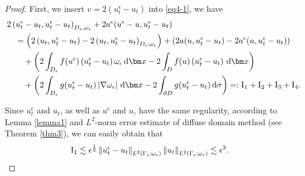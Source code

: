 \documentclass[3p,times]{elsarticle}
\numberwithin{equation}{section}
\newcommand{\dd}{\,{\rm d}}
\begin{document}
\begin{proof}
	First, we insert $v=2(u^{\epsilon}_t-u_t)$ into \eqref{eq4-1}, we have
	\begin{equation}
		\begin{aligned}
			\label{thm5-2}
			&2\left(u_t^{\epsilon}-u_t,u_t^{\epsilon}-u_t\right)_{D_{\epsilon},\omega_{\epsilon}}+2a^{\epsilon}(u^{\epsilon}-u,u_t^{\epsilon}-u_t)\\
			&\quad = \left(2\left(u_t,u_t^{\epsilon}-u_t\right)-2\left(u_t,u_t^{\epsilon}-u_t\right)_{D_{\epsilon};\omega_{\epsilon}}\right)+\left(2a(u,u_t^{\epsilon}-u_t)-2a^{\epsilon}(u,u_t^{\epsilon}-u_t)\right)\\
			&\quad \quad +\left(2\int_{D_{\epsilon}} f(u^{\epsilon})\left(u^{\epsilon}_t-u_t\right)\omega_{\epsilon}\dd\bm x-2\int_D f(u)\left(u_t^{\epsilon}-u_t\right)\dd\bm x\right)\\
			&\quad\quad+\left(2\int_{D_{\epsilon}}g(u_t^{\epsilon}-u_t)\left|\nabla\omega_{\epsilon}\right|\dd \bm x-2\int_{\partial D}g(u_t^{\epsilon}-u_t)\dd\sigma \right)=:\rm{I}_1+\rm{I}_2+\rm{I}_3+\rm{I}_4 .
		\end{aligned} 
	\end{equation}
	
	Since $u^{\epsilon}_t$ and $u_t$, as well as $u^{\epsilon}$ and $u$, have the same regularity, according to Lemma \ref{lemma1} and $L^2$-norm error estimate of diffuse domain method (see Theorem \ref{thm3}), we can easily obtain that
	\begin{equation}
		\begin{aligned}
			\label{thm5-3}
			\rm{I}_1 &\lesssim \epsilon^{\frac 1 2}\left\|u_t^{\epsilon}-u_t\right\|_{L^2(\Gamma_{\epsilon};\omega_{\epsilon})}\left\|u_t\right\|_{L^2(\Gamma_{\epsilon};\omega_{\epsilon})}\lesssim \epsilon^3.
		\end{aligned}
	\end{equation}
	

\end{proof}
\end{document}
